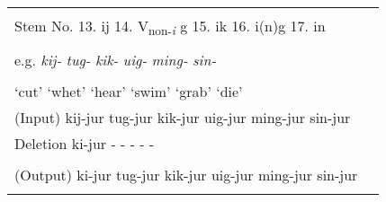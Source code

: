 \begin{table}
\begin{tabular}{ll}
                                                                                                                                                                                                                                                              \\
\tablevspace                                                                                                                                                                                                                                                  \\
Stem No.  13. ij  14. V\textsubscript{non-}\textit{\textsubscript{i}} g  15. ik  16. i(n)g    17. in                                                                                                                                                          \\
                                                                                                                                                                                                                                                              \\
e.g.  \textit{kij-}  \textit{tug-}  \textit{kik-}  \textit{uig-}  \textit{ming-}  \textit{sin-}                                                                                                                                                               \\
                                                                                                                                                                                                                                                              \\
  ‘cut’  ‘whet’  ‘hear’  ‘swim’  ‘grab’  ‘die’                                                                                                                                                                                                                \\
(Input)  kij-jur  tug-jur  kik-jur  uig-jur  ming-jur  sin-jur                                                                                                                                                                                                \\
Deletion  ki-jur  -  -  -  -  -                               \\                                                                                                                                                                                                \\
(Output)  ki-jur  tug-jur  kik-jur  uig-jur  ming-jur  sin-jur\\
\lspbottomrule                                                                                                                                                                                   \\
\end{tabular}


\end{table}
